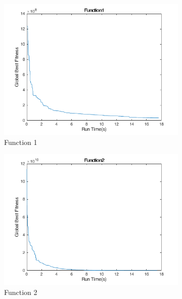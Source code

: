 \clearpage

\begin{figure}
  \centering
  \begin{subfigure}[b]{0.4\textwidth}
    \includegraphics[width=\textwidth]{img/cecrt/f1}
    \caption{Function 1}
  \end{subfigure}
  \begin{subfigure}[b]{0.4\textwidth}
    \includegraphics[width=\textwidth]{img/cecrt/f2}
    \caption{Function 2}
  \end{subfigure}
  \begin{subfigure}[b]{0.4\textwidth}

\end{subfigure}
\end{figure}

